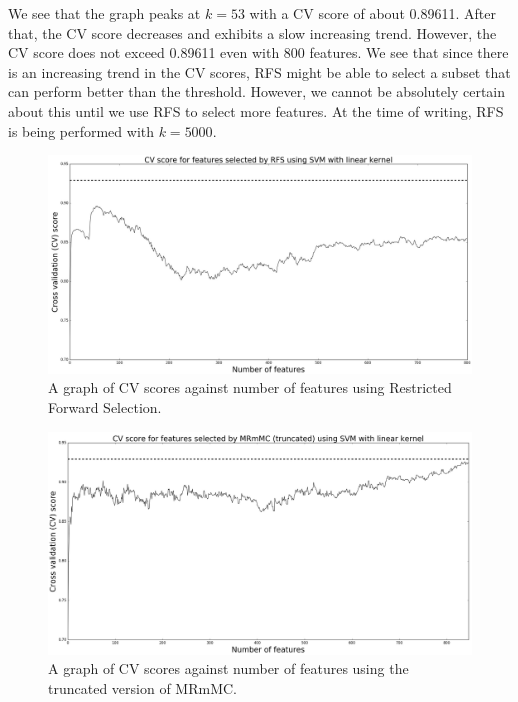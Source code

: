 \documentclass[12pt, twoside, a4paper]{report}
\begin{document}
We see that the graph peaks at $k=53$ with a CV score of about 0.89611. After that, the CV score decreases and exhibits a slow increasing trend. However, the CV score does not exceed 0.89611 even with 800 features. We see that since there is an increasing trend in the CV scores, RFS might be able to select a subset that can perform better than the threshold. However, we cannot be absolutely certain about this until we use RFS to select more features. At the time of writing, RFS is being performed with $k=5000$.

\begin{figure}
\centering
\includegraphics[width=\textwidth]{images/rfs_linear_800.jpeg}
\caption{A graph of CV scores against number of features using Restricted Forward Selection.}
\label{body:rfs_graph}
\end{figure}

\begin{figure}
\centering
\includegraphics[width=\textwidth]{images/mrmmc_trun_linear_847.jpeg}
\caption{A graph of CV scores against number of features using the truncated version of MRmMC.}
\label{body:mrmmc_trun}
\end{figure}
\end{document}
